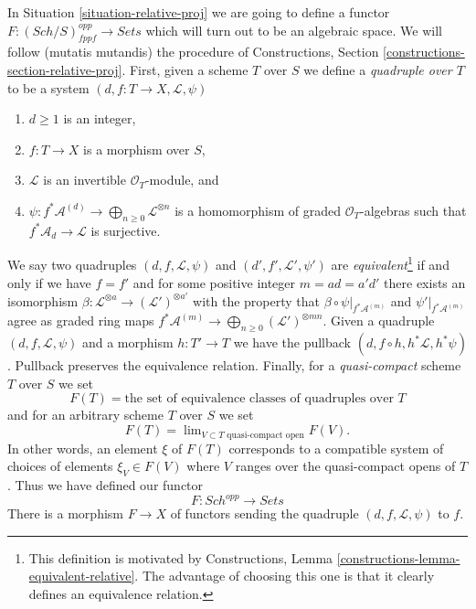 \documentclass{stacks-project}
\theoremstyle{plain}
\theoremstyle{definition}
\theoremstyle{remark}
\numberwithin{equation}{subsection}
\def\lim{\mathop{\mathrm{lim}}\nolimits}
\def\Sch{\mathit{Sch}}
\begin{document}
\noindent
In Situation \ref{situation-relative-proj} we are going to define
a functor $F : (\Sch/S)_{fppf}^{opp} \to \textit{Sets}$ which will
turn out to be an algebraic space. We will follow (mutatis mutandis)
the procedure of
Constructions, Section \ref{constructions-section-relative-proj}.
First, given a scheme $T$ over $S$ we define a
{\it quadruple over $T$} to be a system
$(d, f : T \to X, \mathcal{L}, \psi)$
\begin{enumerate}
\item $d \geq 1$ is an integer,
\item $f : T \to X$ is a morphism over $S$,
\item $\mathcal{L}$ is an invertible $\mathcal{O}_T$-module, and
\item
$\psi : f^*\mathcal{A}^{(d)} \to \bigoplus_{n \geq 0}\mathcal{L}^{\otimes n}$
is a homomorphism of graded $\mathcal{O}_T$-algebras
such that $f^*\mathcal{A}_d \to \mathcal{L}$ is surjective.
\end{enumerate}
We say two quadruples $(d, f, \mathcal{L}, \psi)$ and
$(d', f', \mathcal{L}', \psi')$ are {\it equivalent}\footnote{This
definition is motivated by
Constructions, Lemma \ref{constructions-lemma-equivalent-relative}.
The advantage of choosing this one is that it clearly defines
an equivalence relation.}
if and only if
we have $f = f'$ and for some positive integer $m = ad = a'd'$
there exists an isomorphism
$\beta : \mathcal{L}^{\otimes a} \to (\mathcal{L}')^{\otimes a'}$
with the property that $\beta \circ \psi|_{f^*\mathcal{A}^{(m)}}$
and $\psi'|_{f^*\mathcal{A}^{(m)}}$ agree
as graded ring maps
$f^*\mathcal{A}^{(m)} \to \bigoplus_{n \geq 0} (\mathcal{L}')^{\otimes mn}$.
Given a quadruple $(d, f, \mathcal{L}, \psi)$
and a morphism $h : T' \to T$ we have the pullback
$(d, f \circ h, h^*\mathcal{L}, h^*\psi)$. Pullback preserves 
the equivalence relation. Finally, for a {\it quasi-compact} scheme $T$
over $S$ we set
$$
F(T) = \text{the set of equivalence classes of quadruples over }T
$$
and for an arbitrary scheme $T$ over $S$ we set
$$
F(T)
=
\lim_{V \subset T\text{ quasi-compact open}} F(V).
$$
In other words, an element $\xi$ of $F(T)$ corresponds to a compatible
system of choices of elements $\xi_V \in F(V)$ where $V$ ranges over the
quasi-compact opens of $T$. Thus we have defined our functor
\begin{equation}
\label{equation-proj}
F : \Sch^{opp} \longrightarrow \textit{Sets}
\end{equation}
There is a morphism $F \to X$ of functors sending the quadruple
$(d, f, \mathcal{L}, \psi)$ to $f$.
\end{document}
